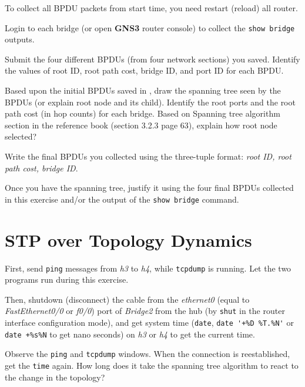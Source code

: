 \documentclass{../UTNetLab}
\begin{document}
    To collect all BPDU packets from start time, you need restart (reload) all router.

    Login to each bridge (or open \textbf{GNS3} router console) to collect the \lstinline[language={cisco}]{show bridge} outputs.
    
    \begin{report}
        \item Submit the four different BPDUs (from four network sections) you saved.
            Identify the values of root ID, root path cost, bridge ID, and port ID for each BPDU.

        \item Based upon the initial BPDUs saved in , draw the spanning tree seen by the BPDUs (or explain root node and its child).
            Identify the root ports and the root path cost (in hop counts) for each bridge.
            Based on Spanning tree algorithm section in the reference book (section 3.2.3 page 63), explain how root node selected?

        \item Write the final BPDUs you collected using the three-tuple format: \textit{{root ID, root path cost, bridge ID}}.

        \item Once you have the spanning tree, justify it using the four final BPDUs collected in this exercise and/or the output of the \lstinline[language={cisco}]{show bridge} command.
    \end{report}


\section{STP over Topology Dynamics}
    First, send \lstinline{ping} messages from \textit{h3} to \textit{h4}, while \lstinline{tcpdump} is running.
    Let the two programs run during this exercise.

    Then, shutdown (disconnect) the cable from the \textit{ethernet0} (equal to \textit{FastEthernet0/0} or \textit{f0/0}) port of \textit{Bridge2} from the hub (by \lstinline[language=cisco]{shut} in the router interface configuration mode), and get system time (\lstinline{date}, \lstinline{date '+%D %T.%N'} or \lstinline{date +%s%N} to get nano seconds) on \textit{h3} or \textit{h4} to get the current time.

    Observe the \lstinline{ping} and \lstinline{tcpdump} windows.
    When the connection is reestablished, get the \lstinline{time} again.
    How long does it take the spanning tree algorithm to react to the change in the topology?
\end{document}
